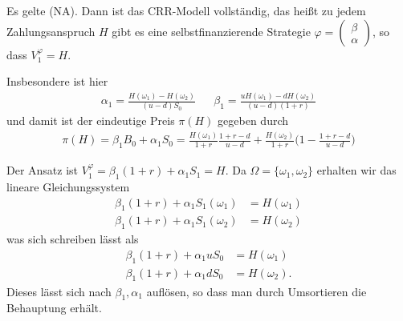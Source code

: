 \documentclass[a4paper,twoside,DIV15,BCOR12mm]{scrbook}
\begin{document}
\begin{lemma}\label{lem:2.4.2}
Es gelte (NA). Dann ist das CRR-Modell vollständig, das heißt zu jedem Zahlungsanspruch $H$ gibt es eine selbstfinanzierende Strategie $\varphi = 
\left(\begin{smallmatrix} \beta \\ \alpha \end{smallmatrix}\right)$,
so dass $V_1^\varphi = H$.

Insbesondere ist hier 
\begin{align*}
\alpha_1 = \frac{H(\omega_1) - H (\omega_2)}{(u-d)S_0} && 
\beta_1 = \frac{u H(\omega_1) - d H(\omega_2)}{(u-d)(1+r)}
\end{align*}
und damit ist der eindeutige Preis $\pi(H)$ gegeben durch
\begin{align*}
\pi(H) = \beta_1 B_0 + \alpha_1 S_0 = \frac{H(\omega_1)}{1+r} \frac{1+r-d}{u-d} + \frac{H(\omega_2)}{1+r} \bigg(1 - \frac{1+r-d}{u-d}\bigg)
\end{align*}
\end{lemma}

\begin{beweis}
Der Ansatz ist $V_1^\varphi = \beta_1(1+r) + \alpha_1 S_1 = H$. Da $\Omega=\{\omega_1,\omega_2\}$ erhalten wir das lineare Gleichungssystem
\begin{align*}
\beta_1(1+r) + \alpha_1 S_1(\omega_1) &= H (\omega_1) \\
\beta_1(1+r) + \alpha_1 S_1(\omega_2) &= H (\omega_2) 
\end{align*}
was sich schreiben lässt als
\begin{align*}
\beta_1(1+r) + \alpha_1 u S_0  &= H (\omega_1) \\
\beta_1(1+r) + \alpha_1 d S_0  &= H (\omega_2).
\end{align*}
Dieses lässt sich nach $\beta_1, \alpha_1$ auflösen, so dass man durch Umsortieren die Behauptung erhält.
\end{beweis}
\end{document}

